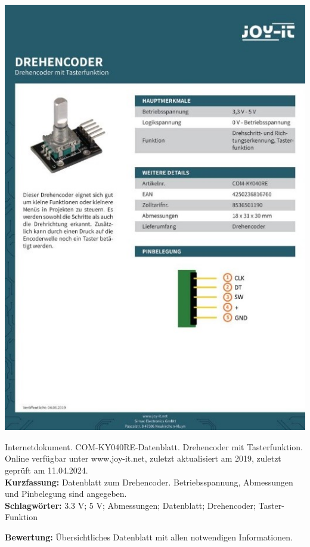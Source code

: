 {
\begin{minipage}{0.38\textwidth}
	\includegraphics[width=\linewidth]{images/Simac.jpg}
\end{minipage}
\hfill
\begin{minipage}{0.6\textwidth}
Internetdokument. COM-KY040RE-Datenblatt. Drehencoder mit Tasterfunktion.
Online verfügbar unter www.joy-it.net, zuletzt aktualisiert am 2019, zuletzt geprüft am 11.04.2024.
\\ \textbf{Kurzfassung:}
Datenblatt zum Drehencoder. Betriebsspannung, Abmessungen und Pinbelegung sind angegeben.
\\ \textbf{Schlagwörter:}
3.3 V; 5 V; Abmessungen; Datenblatt; Drehencoder; Taster-Funktion
\end{minipage}
\textbf{Bewertung:}
Übersichtliches Datenblatt mit allen notwendigen Informationen.
}

